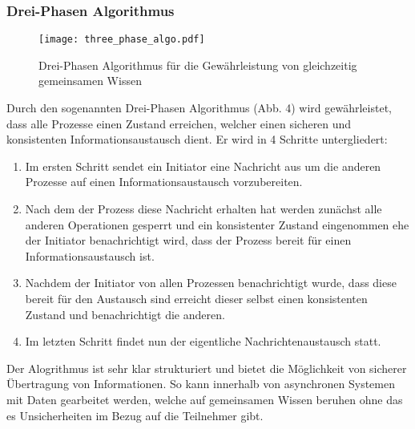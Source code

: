 \subsubsection{Drei-Phasen Algorithmus}
\begin{figure}[H]
\centering
      \texttt{[image: three\_phase\_algo.pdf]}
  \caption{ Drei-Phasen Algorithmus für die Gewährleistung von gleichzeitig gemeinsamen Wissen \cite{kshemkalyani2011distributed}}
\label{pic:lbsn}
\end{figure}
Durch den sogenannten Drei-Phasen Algorithmus (Abb. 4) wird gewährleistet, dass alle Prozesse einen Zustand erreichen, welcher einen sicheren und konsistenten Informationsaustausch dient. Er wird in 4 Schritte untergliedert:
\begin{enumerate}
\item Im ersten Schritt sendet ein Initiator eine Nachricht aus um die anderen Prozesse auf einen Informationsaustausch vorzubereiten.
\item Nach dem der Prozess diese Nachricht erhalten hat werden zunächst alle anderen Operationen gesperrt und ein konsistenter Zustand eingenommen ehe der Initiator benachrichtigt wird, dass der Prozess bereit für einen Informationsaustausch ist.
\item Nachdem der Initiator von allen Prozessen benachrichtigt wurde, dass diese bereit für den Austausch sind erreicht dieser selbst einen konsistenten Zustand und benachrichtigt die anderen.
\item Im letzten Schritt findet nun der eigentliche Nachrichtenaustausch statt. 
\end{enumerate}

Der Alogrithmus ist sehr klar strukturiert und bietet die Möglichkeit von sicherer Übertragung von Informationen. So kann innerhalb von asynchronen Systemen mit Daten gearbeitet werden, welche auf gemeinsamen Wissen beruhen ohne das es Unsicherheiten im Bezug auf die Teilnehmer gibt. 